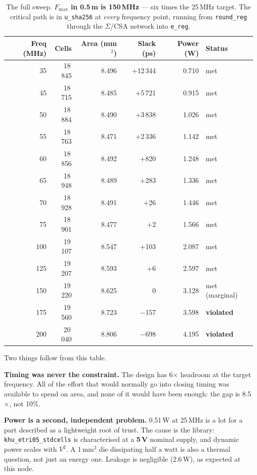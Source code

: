\documentclass[11pt,a4paper]{article}
\begin{document}
\begin{table}[h]
\centering\small
\setlength{\tabcolsep}{5pt}
\begin{tabular}{@{}rrrrrl@{}}
\toprule
\textbf{Freq (MHz)} & \textbf{Cells} & \textbf{Area (mm$^2$)} &
\textbf{Slack (ps)} & \textbf{Power (W)} & \textbf{Status} \\
\midrule
 35 & 18\,845 & 8.496 & +12\,344 & 0.710 & met \\
 45 & 18\,715 & 8.485 & +5\,721 & 0.915 & met \\
 50 & 18\,884 & 8.490 & +3\,838 & 1.026 & met \\
 55 & 18\,763 & 8.471 & +2\,336 & 1.142 & met \\
 60 & 18\,856 & 8.492 & +820 & 1.248 & met \\
 65 & 18\,948 & 8.489 & +283 & 1.336 & met \\
 70 & 18\,928 & 8.491 & +26 & 1.446 & met \\
 75 & 18\,901 & 8.477 & +2 & 1.566 & met \\
100 & 19\,107 & 8.547 & +103 & 2.087 & met \\
125 & 19\,207 & 8.593 & +6 & 2.597 & met \\
150 & 19\,220 & 8.625 & 0 & 3.128 & met (marginal) \\
175 & 19\,560 & 8.723 & $-$157 & 3.598 & \textbf{violated} \\
200 & 20\,040 & 8.806 & $-$698 & 4.195 & \textbf{violated} \\
\bottomrule
\end{tabular}
\caption{The full sweep. \textbf{$F_{\max}$ in 0.5\,\textmu m is 150\,MHz} ---
six times the 25\,MHz target. The critical path is in \texttt{u\_sha256} at
\emph{every} frequency point, running from \texttt{round\_reg} through the
$\Sigma$/CSA network into \texttt{e\_reg}.}
\label{tab:sweep}
\end{table}

Two things follow from this table.

\textbf{Timing was never the constraint.} The design has 6$\times$ headroom at
the target frequency. All of the effort that would normally go into closing
timing was available to spend on area, and none of it would have been enough:
the gap is 8.5$\times$, not 10\%.

\textbf{Power is a second, independent problem.} 0.51\,W at 25\,MHz is a lot
for a part described as a lightweight root of trust. The cause is the library:
\texttt{khu\_etri05\_stdcells} is characterised at a \textbf{5\,V} nominal
supply, and dynamic power scales with $V^2$. A 1\,mm$^2$ die dissipating half a
watt is also a thermal question, not just an energy one. Leakage is negligible
(2.6\,\textmu W), as expected at this node.
\end{document}
